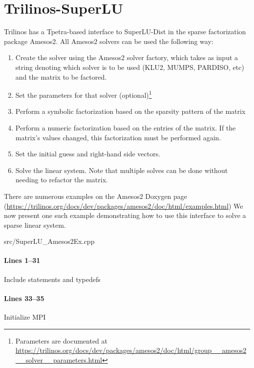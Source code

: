 \section{Trilinos-SuperLU}

Trilinos has a Tpetra-based interface to SuperLU-Dist in the sparse
factorization package Amesos2.  All Amesos2 solvers can be used the
following way:

\begin{enumerate}
  \item Create the solver using the Amesos2 solver factory, which takes as input
  a string denoting which solver is to be used (KLU2, MUMPS, PARDISO, etc) and
  the matrix to be factored.
  \item Set the parameters for that solver (optional)\footnote{Parameters are
  documented at
  \url{https://trilinos.org/docs/dev/packages/amesos2/doc/html/group__amesos2__solver__parameters.html}}
  \item Perform a symbolic factorization based on the sparsity pattern of the
  matrix
  \item Perform a numeric factorization based on the entries of the matrix.  If
  the matrix's values changed, this factorization must be performed again.
  \item Set the initial guess and right-hand side vectors.
  \item Solve the linear system.  Note that multiple solves can be done without
  needing to refactor the matrix.
\end{enumerate}

There are numerous examples on the Amesos2 Doxygen page
(\url{https://trilinos.org/docs/dev/packages/amesos2/doc/html/examples.html})
We now present one such example demonstrating how to use this interface to solve
a sparse linear system.

\begin{lstinputlisting}[caption=SuperLU\_Amesos2Ex.cpp,label=SuperLU_Amesos2Ex.cpp]{src/SuperLU_Amesos2Ex.cpp}
\end{lstinputlisting}

\paragraph{Lines 1--31}
Include statements and typedefs

\paragraph{Lines 33--35}
Initialize MPI

